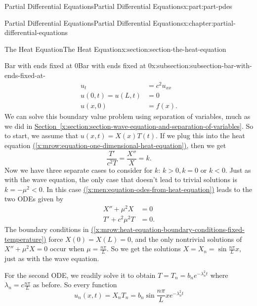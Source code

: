 \documentclass[oneside,10pt,]{book}
\newcommand{\xreffont}{\relax}
\numberwithin{equation}{part}
\newcommand{\lt}{<}
\newcommand{\gt}{>}
\newcommand{\amp}{&}
\begin{document}
\begin{partptx}{Partial Differential Equations}{}{Partial Differential Equations}{}{}{x:part:part-pdes}
\begin{chapterptx}{Partial Differential Equations}{}{Partial Differential Equations}{}{}{x:chapter:partial-differential-equations}
\begin{sectionptx}{The Heat Equation}{}{The Heat Equation}{}{}{x:section:section-the-heat-equation}
\begin{subsectionptx}{Bar with ends fixed at \(0\)}{}{Bar with ends fixed at \(0\)}{}{}{x:subsection:subsection-bar-with-ends-fixed-at-}
%
\begin{align}
u_{t} \amp = c^{2}u_{xx} \label{x:mrow:equation-one-dimensional-heat-equation}\\
u(0,t) = u(L,t) \amp = 0 \label{x:mrow:heat-equation-boundary-conditions-fixed-temperature}\\
u(x,0) \amp = f(x) \text{.}\label{x:mrow:heat-equation-initial-condition}
\end{align}
We can solve this boundary value problem using separation of variables, much as we did in \hyperref[x:section:section-wave-equation-and-separation-of-variables]{Section~{\xreffont\ref{x:section:section-wave-equation-and-separation-of-variables}}}. So to start, we assume that \(u(x,t) = X(x)T(t)\). If we plug this into the heat equation \hyperref[x:mrow:equation-one-dimensional-heat-equation]{({\xreffont\ref{x:mrow:equation-one-dimensional-heat-equation}})}, then we get%
%
\begin{equation}
\frac{T'}{c^{2}T} = \frac{X''}{X} = k.\label{x:men:equation-odes-from-heat-equation}
\end{equation}
Now we have three separate cases to consider for \(k\): \(k\gt0, k=0\) or \(k\lt0\). Just as with the wave equation, the only case that doesn't lead to trivial solutions is \(k=-\mu^{2}\lt0\). In this case \hyperref[x:men:equation-odes-from-heat-equation]{({\xreffont\ref{x:men:equation-odes-from-heat-equation}})} leads to the two ODEs given by%
%
\begin{align*}
X''+\mu^{2}X \amp = 0 \\
T'+c^{2}\mu^{2}T \amp = 0 \text{.}
\end{align*}
The boundary conditions in \hyperref[x:mrow:heat-equation-boundary-conditions-fixed-temperature]{({\xreffont\ref{x:mrow:heat-equation-boundary-conditions-fixed-temperature}})} force \(X(0) = X(L) = 0\), and the only nontrivial solutions of \(X''+\mu^{2}X = 0\) occur when \(\mu = \frac{n\pi}{L}\). So we get the solutions \(X = X_{n} = \sin\frac{n\pi}{L}x\), just as with the wave equation.%
\par
For the second ODE, we readily solve it to obtain \(T = T_{n} = b_{n}e^{-\lambda_{n}^{2}t}\) where \(\lambda_{n} = c\frac{n\pi}{L}\) as before. So every function%
\begin{equation*}
u_{n}(x,t) = X_{n}T_{n} = b_{n}\sin\frac{n\pi}{L}xe^{-\lambda_{n}^{2}t}
\end{equation*}

\end{subsectionptx}
\end{sectionptx}
\end{chapterptx}
\end{partptx}
\end{document}
